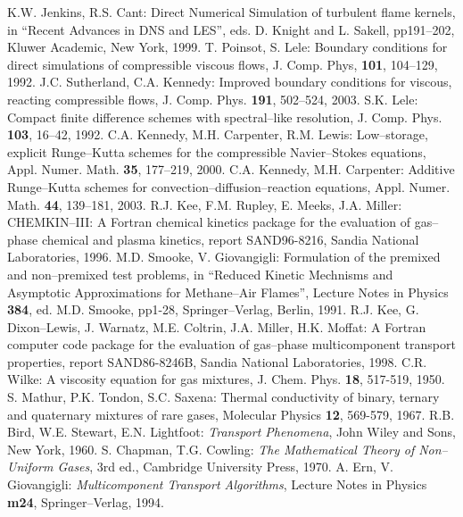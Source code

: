 \documentclass[dvips]{article}
\begin{document}
\newpage
\begin{thebibliography}{99}
K.W. Jenkins, R.S. Cant: Direct Numerical Simulation
of turbulent flame kernels, in ``Recent Advances in DNS and LES'', eds.
D. Knight and L. Sakell, pp191--202, Kluwer Academic, New York, 1999.
T. Poinsot, S. Lele: Boundary conditions for
direct simulations of compressible viscous flows, J. Comp. Phys, {\bf 101},
104--129, 1992.
J.C. Sutherland, C.A. Kennedy: Improved
boundary conditions for viscous, reacting compressible flows,
J. Comp. Phys. {\bf 191}, 502--524, 2003.
S.K. Lele: Compact finite difference schemes with
spectral--like resolution, J. Comp. Phys. {\bf 103}, 16--42, 1992.
C.A. Kennedy, M.H. Carpenter, R.M. Lewis:
Low--storage, explicit Runge--Kutta schemes for the compressible
Navier--Stokes equations, Appl. Numer. Math. {\bf 35}, 177--219, 2000.
C.A. Kennedy, M.H. Carpenter:
Additive Runge--Kutta schemes for convection--diffusion--reaction
equations, Appl. Numer. Math. {\bf 44}, 139--181, 2003.
R.J. Kee, F.M. Rupley, E. Meeks, J.A. Miller: CHEMKIN--III:
A Fortran chemical kinetics package for the evaluation of gas--phase chemical
and plasma kinetics, report SAND96-8216, Sandia National Laboratories, 1996.
M.D. Smooke, V. Giovangigli: Formulation of
the premixed and non--premixed test problems, in ``Reduced Kinetic
Mechnisms and Asymptotic Approximations for Methane--Air Flames'',
Lecture Notes in Physics {\bf 384}, ed. M.D. Smooke, pp1-28, Springer--Verlag,
Berlin, 1991.
R.J. Kee, G. Dixon--Lewis, J. Warnatz, M.E. Coltrin,
J.A. Miller, H.K. Moffat: A Fortran computer code package for the
evaluation of gas--phase multicomponent transport properties,
report SAND86-8246B, Sandia National Laboratories, 1998.
C.R. Wilke: A viscosity equation for gas mixtures, J. Chem.
Phys. {\bf 18}, 517-519, 1950.
S. Mathur, P.K. Tondon, S.C. Saxena: Thermal conductivity
of binary, ternary and quaternary mixtures of rare gases,
Molecular Physics {\bf 12}, 569-579, 1967.
R.B. Bird, W.E. Stewart, E.N. Lightfoot: {\it Transport
Phenomena}, John Wiley and Sons, New York, 1960.
S. Chapman, T.G. Cowling: {\it The Mathematical
Theory of Non--Uniform Gases}, 3rd ed., Cambridge University Press, 1970.
A. Ern, V. Giovangigli: {\it Multicomponent Transport
Algorithms}, Lecture Notes in Physics {\bf m24}, Springer--Verlag, 1994.

\end{thebibliography}
\end{document}
